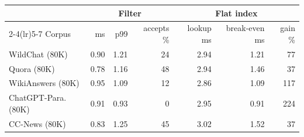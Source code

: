 \begin{tabular}{@{}lrrrrrr@{}}
\toprule
& \multicolumn{3}{c}{Filter} & \multicolumn{3}{c}{Flat index} \\
\cmidrule(lr){2-4}\cmidrule(lr){5-7}
Corpus & ms & p99 & accepts \% & lookup ms & break-even ms & gain \% \\
\midrule
WildChat (80K) & 0.90 & 1.21 & 24 & 2.94 & 1.21 & 77 \\
Quora (80K) & 0.78 & 1.16 & 48 & 2.94 & 1.46 & 37 \\
WikiAnswers (80K) & 0.95 & 1.09 & 12 & 2.86 & 1.09 & 117 \\
ChatGPT-Para. (80K) & 0.91 & 0.93 & 0 & 2.95 & 0.91 & 224 \\
CC-News (80K) & 0.83 & 1.25 & 45 & 3.02 & 1.52 & 37 \\
\bottomrule
\end{tabular}
